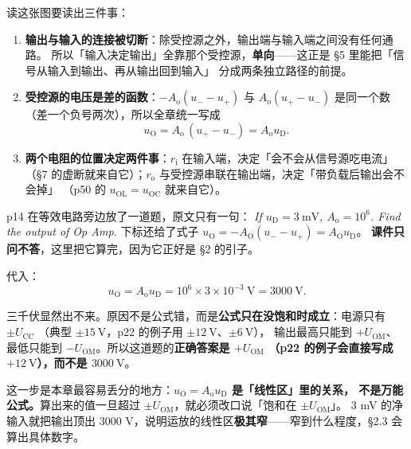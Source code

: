 \documentclass[11pt]{ctexart}
\begin{document}
读这张图要读出三件事：

\begin{enumerate}
\item \textbf{输出与输入的连接被切断}：除受控源之外，输出端与输入端之间没有任何通路。
所以「输入决定输出」全靠那个受控源，\textbf{单向}——这正是 §5 里能把「信号从输入到输出、再从输出回到输入」
分成两条独立路径的前提。
\item \textbf{受控源的电压是差的函数}：$-A_{\mathrm{o}}(u_--u_+)$ 与 $A_{\mathrm{o}}(u_+-u_-)$ 是同一个数
（差一个负号两次），所以全章统一写成
\[
u_{\mathrm{O}}=A_{\mathrm{o}}\,(u_+-u_-)=A_{\mathrm{o}}u_{\mathrm{D}} .
\]
\item \textbf{两个电阻的位置决定两件事}：$r_{\mathrm{i}}$ 在输入端，决定「会不会从信号源吃电流」
（§7 的虚断就来自它）；$r_{\mathrm{o}}$ 与受控源串联在输出端，决定「带负载后输出会不会掉」
（p50 的 $u_{\mathrm{OL}}=u_{\mathrm{OC}}$ 就来自它）。
\end{enumerate}


p14 在等效电路旁边放了一道题，原文只有一句：
\textit{If $u_{\mathrm{D}}=3\ \mathrm{mV}$, $A_{\mathrm{o}}=10^{6}$. Find the output of Op Amp.}
下标还给了式子 $u_{\mathrm{O}}=-A_{\mathrm{O}}(u_- - u_+)=A_{\mathrm{O}}u_{\mathrm{D}}$。
\textbf{课件只问不答}，这里把它算完，因为它正好是 §2 的引子。

代入：
\[
u_{\mathrm{O}}=A_{\mathrm{o}}u_{\mathrm{D}}=10^{6}\times 3\times10^{-3}\ \mathrm{V}=3000\ \mathrm{V}.
\]

三千伏显然出不来。原因不是公式错，而是\textbf{公式只在没饱和时成立}：电源只有 $\pm U_{\mathrm{CC}}$
（典型 $\pm15\ \mathrm{V}$，p22 的例子用 $\pm12\ \mathrm{V}$、$\pm6\ \mathrm{V}$），
输出最高只能到 $+U_{\mathrm{OM}}$、最低只能到 $-U_{\mathrm{OM}}$。所以这道题的\textbf{正确答案是 $+U_{\mathrm{OM}}$
（p22 的例子会直接写成 $+12\ \mathrm{V}$），而不是 $3000\ \mathrm{V}$}。

\begin{wbx}
这一步是本章最容易丢分的地方：\textbf{$u_{\mathrm{O}}=A_{\mathrm{o}}u_{\mathrm{D}}$ 是「线性区」里的关系，
不是万能公式。}算出来的值一旦超过 $\pm U_{\mathrm{OM}}$，就必须改口说「饱和在 $\pm U_{\mathrm{OM}}$」。
3 mV 的净输入就把输出顶出 3000 V，说明运放的线性区\textbf{极其窄}——窄到什么程度，§2.3 会算出具体数字。
\end{wbx}

\end{document}
